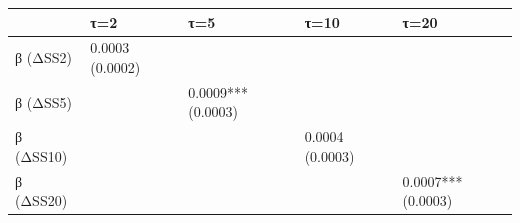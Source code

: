 \begin{tabular}{lllll}
\toprule
 & τ=2 & τ=5 & τ=10 & τ=20 \\
\midrule
β (ΔSS2) & 0.0003
(0.0002) &  &  &  \\
β (ΔSS5) &  & 0.0009***
(0.0003) &  &  \\
β (ΔSS10) &  &  & 0.0004
(0.0003) &  \\
β (ΔSS20) &  &  &  & 0.0007***
(0.0003) \\
\bottomrule
\end{tabular}
